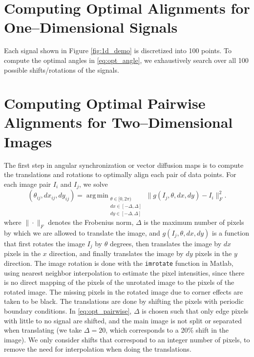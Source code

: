 \documentclass[11pt]{article}
\DeclareMathOperator*{\argmin}{arg\,min}
\begin{document}
\appendix

\section{Computing Optimal Alignments for One--Dimensional Signals} 

Each signal shown in Figure \ref{fig:1d_demo} is discretized into 100 points. 
%
To compute the optimal angles in \eqref{eq:opt_angle}, we exhaustively search over all 100 possible shifts/rotations of the signals. 

\section{Computing Optimal Pairwise Alignments for Two--Dimensional Images}

The first step in angular synchronization or vector diffusion maps is to compute the translations and rotations to optimally align each pair of data points. 
%
For each image pair $I_i$ and $I_j$, we solve
\begin{equation}\label{eq:opt_pairwise}
(\theta_{ij}, dx_{ij}, dy_{ij}) = \argmin_{
\begin{matrix}
\theta \in [0, 2\pi) \\ 
dx \in [-\Delta, \Delta]\\ 
dy \in [-\Delta, \Delta]
\end{matrix}
} \|g(I_j, \theta, dx, dy) - I_i \|_F^2.
\end{equation}
where $\| \cdot \|_F$ denotes the Frobenius norm, $\Delta$ is the maximum number of pixels by which we are allowed to translate the image, and $g(I_j, \theta, dx, dy)$ is a function that first rotates the image $I_j$ by $\theta$ degrees, then translates the image by $dx$ pixels in the $x$ direction, and finally translates the image by $dy$ pixels in the $y$ direction. 
%
The image rotation is done with the \texttt{imrotate} function in Matlab, using nearest neighbor interpolation to estimate the pixel intensities, since there is no direct mapping of the pixels of the unrotated image to the pixels of the rotated image.
%
The missing pixels in the rotated image due to corner effects are taken to be black.
%
The translations are done by shifting the pixels with periodic boundary conditions.
%
In \eqref{eq:opt_pairwise}, $\Delta$ is chosen such that only edge pixels with little to no signal are shifted, and the main image is not split or separated when translating (we take $\Delta=20$, which corresponds to a 20\% shift in the image).
%
We only consider shifts that correspond to an integer number of pixels, to remove the need for interpolation when doing the translations.  
\end{document}

